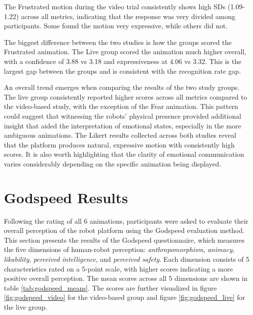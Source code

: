 The Frustrated motion during the video trial consistently shows high SDs (1.09-1.22) across all metrics, indicating that the response was very divided among participants. Some found the motion very expressive, while others did not.

The biggest difference between the two studies is how the groups scored the Frustrated animation. The Live group scored the animation much higher overall, with a confidence of 3.88 vs 3.18 and expressiveness at 4.06 vs 3.32. This is the largest gap between the groups and is consistent with the recognition rate gap.

An overall trend emerges when comparing the results of the two study groups. The live group consistently reported higher scores across all metrics compared to the video-based study, with the exception of the Fear animation. This pattern could suggest that witnessing the robots' physical presence provided additional insight that aided the interpretation of emotional states, especially in the more ambiguous animations. The Likert results collected across both studies reveal that the platform produces natural, expressive motion with consistently high scores. It is also worth highlighting that the clarity of emotional communication varies considerably depending on the specific animation being displayed. 











\newpage
\section{Godspeed Results}
Following the rating of all 6 animations, participants were asked to evaluate their overall perception of the robot platform using the Godspeed evaluation method. This section presents the results of the Godspeed questionnaire, which measures the five dimensions of human-robot perception: \textit{anthropomorphism}, \textit{animacy}, \textit{likability}, 
\textit{perceived intelligence}, and \textit{perceived safety}. Each dimension consists of 5 characteristics rated on a 5-point scale, with higher scores indicating a more positive overall perception. The mean scores across all 5 dimensions are shown in table \ref{tab:godspeed_means}. The scores are further visualized in figure \ref{fig:godspeed_video} for the video-based group and figure \ref{fig:godspeed_live} for the live group. 

